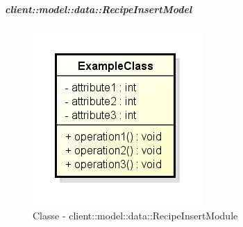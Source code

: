 		\subparagraph{client::model::data::RecipeInsertModel} %
		\label{subp:client_model_data_recipeinsertmodel}
			\begin{figure}[htbp]
				\centering
				\centerline{\includegraphics[scale=0.7]{./images/client/classes/example_class.png}}
				\caption{Classe - client::model::data::RecipeInsertModule}
			\end{figure}
